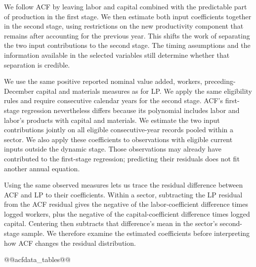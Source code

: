 We follow ACF by leaving labor and capital combined with the predictable part of production in the first stage. We then estimate both input coefficients together in the second stage, using restrictions on the new productivity component that remains after accounting for the previous year. This shifts the work of separating the two input contributions to the second stage. The timing assumptions and the information available in the selected variables still determine whether that separation is credible.

We use the same positive reported nominal value added, workers, preceding-December capital and materials measures as for LP. We apply the same eligibility rules and require consecutive calendar years for the second stage. ACF's first-stage regression nevertheless differs because its polynomial includes labor and labor's products with capital and materials. We estimate the two input contributions jointly on all eligible consecutive-year records pooled within a sector. We also apply these coefficients to observations with eligible current inputs outside the dynamic stage. Those observations may already have contributed to the first-stage regression; predicting their residuals does not fit another annual equation.

Using the same observed measures lets us trace the residual difference between ACF and LP to their coefficients. Within a sector, subtracting the LP residual from the ACF residual gives the negative of the labor-coefficient difference times logged workers, plus the negative of the capital-coefficient difference times logged capital. Centering then subtracts that difference's mean in the sector's second-stage sample. We therefore examine the estimated coefficients before interpreting how ACF changes the residual distribution.

@@acfdata_tables@@

